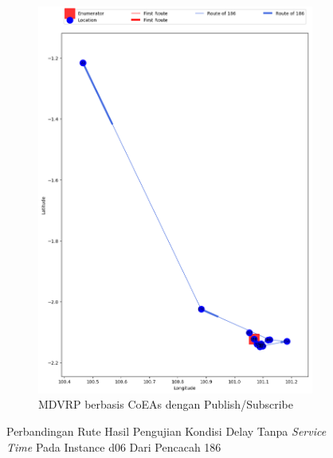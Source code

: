 \begin{figure}[H]\ContinuedFloat
	\centering
	\begin{subfigure}[t]{\textwidth}
		\centering
		\includegraphics[width=\textwidth]{Resources/Images/delayed_6/real_m15_n100_delayed_6_186_pubsub_coes}
		\caption{MDVRP berbasis CoEAs dengan Publish/Subscribe}
		\label{fig:real_m15_n100_delayed_6_186_pubsub_coes}
	\end{subfigure}
	\caption{Perbandingan Rute Hasil Pengujian Kondisi Delay Tanpa \textit{Service Time} Pada Instance d06 Dari Pencacah 186}
	\label{fig:real_m15_n100_delayed_6_186_contd}
\end{figure}


